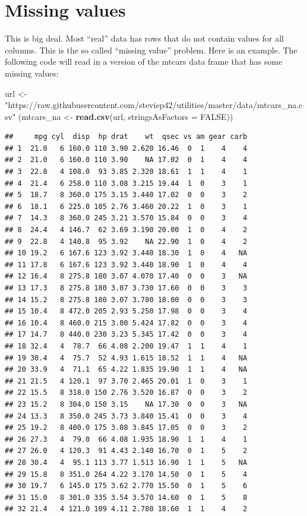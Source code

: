 \documentclass[]{book}
\newenvironment{Shaded}{\begin{snugshade}}{\end{snugshade}}
\newcommand{\KeywordTok}[1]{\textcolor[rgb]{0.13,0.29,0.53}{\textbf{#1}}}
\newcommand{\DataTypeTok}[1]{\textcolor[rgb]{0.13,0.29,0.53}{#1}}
\newcommand{\StringTok}[1]{\textcolor[rgb]{0.31,0.60,0.02}{#1}}
\newcommand{\OtherTok}[1]{\textcolor[rgb]{0.56,0.35,0.01}{#1}}
\newcommand{\NormalTok}[1]{#1}
\begin{document}
\section{Missing values}\label{missing-values}

This is big deal. Most ``real'' data has rows that do not contain values
for all columns. This is the so called ``missing value'' problem. Here
is an example. The following code will read in a version of the mtcars
data frame that has some missing values:

\begin{Shaded}
\begin{Highlighting}[]
\NormalTok{url <-}\StringTok{ "https://raw.githubusercontent.com/steviep42/utilities/master/data/mtcars_na.csv"}
\NormalTok{(mtcars_na <-}\StringTok{ }\KeywordTok{read.csv}\NormalTok{(url, }\DataTypeTok{stringsAsFactors =} \OtherTok{FALSE}\NormalTok{))}
\end{Highlighting}
\end{Shaded}

\begin{verbatim}
##     mpg cyl  disp  hp drat    wt  qsec vs am gear carb
## 1  21.0   6 160.0 110 3.90 2.620 16.46  0  1    4    4
## 2  21.0   6 160.0 110 3.90    NA 17.02  0  1    4    4
## 3  22.8   4 108.0  93 3.85 2.320 18.61  1  1    4    1
## 4  21.4   6 258.0 110 3.08 3.215 19.44  1  0    3    1
## 5  18.7   8 360.0 175 3.15 3.440 17.02  0  0    3    2
## 6  18.1   6 225.0 105 2.76 3.460 20.22  1  0    3    1
## 7  14.3   8 360.0 245 3.21 3.570 15.84  0  0    3    4
## 8  24.4   4 146.7  62 3.69 3.190 20.00  1  0    4    2
## 9  22.8   4 140.8  95 3.92    NA 22.90  1  0    4    2
## 10 19.2   6 167.6 123 3.92 3.440 18.30  1  0    4   NA
## 11 17.8   6 167.6 123 3.92 3.440 18.90  1  0    4    4
## 12 16.4   8 275.8 180 3.07 4.070 17.40  0  0    3   NA
## 13 17.3   8 275.8 180 3.07 3.730 17.60  0  0    3    3
## 14 15.2   8 275.8 180 3.07 3.780 18.00  0  0    3    3
## 15 10.4   8 472.0 205 2.93 5.250 17.98  0  0    3    4
## 16 10.4   8 460.0 215 3.00 5.424 17.82  0  0    3    4
## 17 14.7   8 440.0 230 3.23 5.345 17.42  0  0    3    4
## 18 32.4   4  78.7  66 4.08 2.200 19.47  1  1    4    1
## 19 30.4   4  75.7  52 4.93 1.615 18.52  1  1    4   NA
## 20 33.9   4  71.1  65 4.22 1.835 19.90  1  1    4   NA
## 21 21.5   4 120.1  97 3.70 2.465 20.01  1  0    3    1
## 22 15.5   8 318.0 150 2.76 3.520 16.87  0  0    3    2
## 23 15.2   8 304.0 150 3.15    NA 17.30  0  0    3   NA
## 24 13.3   8 350.0 245 3.73 3.840 15.41  0  0    3    4
## 25 19.2   8 400.0 175 3.08 3.845 17.05  0  0    3    2
## 26 27.3   4  79.0  66 4.08 1.935 18.90  1  1    4    1
## 27 26.0   4 120.3  91 4.43 2.140 16.70  0  1    5    2
## 28 30.4   4  95.1 113 3.77 1.513 16.90  1  1    5   NA
## 29 15.8   8 351.0 264 4.22 3.170 14.50  0  1    5    4
## 30 19.7   6 145.0 175 3.62 2.770 15.50  0  1    5    6
## 31 15.0   8 301.0 335 3.54 3.570 14.60  0  1    5    8
## 32 21.4   4 121.0 109 4.11 2.780 18.60  1  1    4    2
\end{verbatim}
\end{document}
